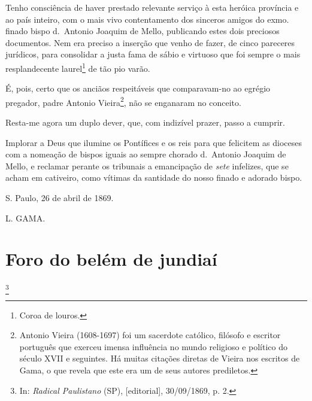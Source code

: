 Tenho consciência de haver prestado relevante serviço à esta heróica
província e ao país inteiro, com o mais vivo contentamento dos sinceros
amigos do exmo. finado bispo d.~Antonio Joaquim de Mello, publicando
estes dois preciosos documentos. Nem era preciso a inserção que venho de
fazer, de cinco pareceres jurídicos, para consolidar a justa fama de
sábio e virtuoso que foi sempre o mais resplandecente laurel\footnote{
  Coroa de louros.} de tão pio varão.

É, pois, certo que os anciãos respeitáveis que comparavam-no ao egrégio
pregador, padre Antonio Vieira\footnote{Antonio Vieira (1608-1697) foi
  um sacerdote católico, filósofo e escritor português que exerceu
  imensa influência no mundo religioso e político do século XVII e
  seguintes. Há muitas citações diretas de Vieira nos escritos de Gama,
  o que revela que este era um de seus autores prediletos.}, não se
enganaram no conceito.

Resta-me agora um duplo dever, que, com indizível prazer, passo a
cumprir.

Implorar a Deus que ilumine os Pontífices e os reis para que felicitem
as dioceses com a nomeação de bispos iguais ao sempre chorado d.~Antonio
Joaquim de Mello, e reclamar perante os tribunais a emancipação de
\emph{sete} infelizes, que se acham em cativeiro, como vítimas da
santidade do nosso finado e adorado bispo.

S. Paulo, 26 de abril de 1869.

L. GAMA.

\chapter{Foro do belém de jundiaí}\footnote{In: \emph{Radical Paulistano}
  (SP), {[}editorial{]}, 30/09/1869, p. 2.}

